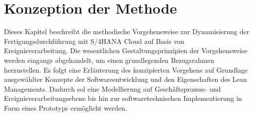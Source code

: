 \chapter{Konzeption der Methode}\label{ch:Methode}
Dieses Kapitel beschreibt die methodische Vorgehensweise zur Dynamisierung der Fertigungsdurchführung mit S/4HANA Cloud auf Basis von Ereignisverarbeitung.
Die wesentlichen Gestaltungsprinzipien der Vorgehensweise werden eingangs abgehandelt, um einen grundlegenden Bezugsrahmen herzustellen.
Es folgt eine Erläuterung des konzipierten Vorgehens auf Grundlage ausgewählter Konzepte der Softwareentwicklung und den Eigenschaften des Lean Managements. Dadurch sol eine Modellierung auf Geschäftsprozess- und Ereignisverarbeitungsebene bis hin zur softwaretechnischen Implementierung in Form eines Prototyps ermöglicht werden.


